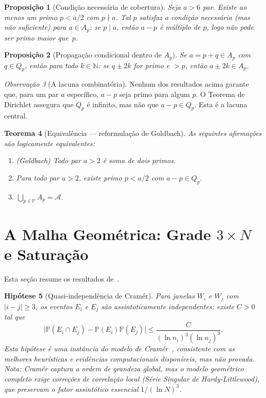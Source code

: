 \documentclass[12pt,a4paper]{article}
\newtheorem{theorem}{Teorema}[section]
\newtheorem{proposition}[theorem]{Proposi\c{c}\~ao}
\newtheorem{hypothesis}[theorem]{Hip\'otese}
\theoremstyle{remark}
\newtheorem{remark}[theorem]{Observa\c{c}\~ao}
\newcommand{\calA}{\mathcal{A}}
\newcommand{\NN}{\mathbb{N}}
\newcommand{\bP}{\mathbb{P}}
\begin{document}
	\begin{proposition}[Condição necessária de cobertura]
		\label{prop:cond-nec}
		Seja $a>6$ par. Existe ao menos um primo $p<a/2$ com $p\nmid a$.
		Tal $p$ satisfaz a condi\c{c}\~ao necess\'aria (mas n\~ao suficiente) para $a\in A_p$:
		se $p\mid a$, ent\~ao $a-p$ \'e m\'ultiplo de $p$, logo n\~ao pode ser primo maior que~$p$.
	\end{proposition}
	
	\begin{proposition}[Propagação condicional dentro de $A_p$]
		Se $a = p+q \in A_p$ com $q\in Q_p$, ent\~ao para todo $k\in\NN$: se $q\pm 2k$
		for primo e $> p$, ent\~ao $a\pm 2k\in A_p$.
	\end{proposition}
	
	\begin{remark}[A lacuna combinatória]
		\label{rem:lacuna-comb}
		Nenhum dos resultados acima garante que, para um par $a$ espec\'ifico,
		$a-p$ seja primo para algum $p$.  O Teorema de Dirichlet assegura que $Q_p$ \'e
		infinito, mas n\~ao que $a-p\in Q_p$.  Esta \'e a lacuna central.
	\end{remark}
	
	\begin{theorem}[Equivalência --- reformulação de Goldbach]
		\label{thm:equiv}
		As seguintes afirma\c{c}\~oes s\~ao logicamente equivalentes:
		\begin{enumerate}[\normalfont(i)]
			\item \emph{(Goldbach)} Todo par $a>2$ \'e soma de dois primos.
			\item Para todo par $a>2$, existe primo $p<a/2$ com $a-p\in Q_p$.
			\item $\bigcup_{p\in\bP} A_p = \calA$.
		\end{enumerate}
	\end{theorem}
	
	\section{A Malha Geom\'etrica: Grade $3\times N$ e Satura\c{c}\~ao}
	
	Esta se\c{c}\~ao resume os resultados de~\cite{bandeira2026geometrica}.
	
	\begin{hypothesis}[Quasi-independência de Cramér]
		Para janelas $W_i$ e $W_j$ com $|i-j|\geq 3$, os eventos $E_i$ e $E_j$ s\~ao
		assintoticamente independentes: existe $C>0$ tal que
		\[
		\bigl|\bP(E_i\cap E_j) - \bP(E_i)\bP(E_j)\bigr|
		\leq \frac{C}{(\ln n_i)^3(\ln n_j)^3}.
		\]
		Esta hip\'otese \'e uma inst\^ancia do modelo de Cram\'er~\cite{cramer1936},
		consistente com as melhores heur\'isticas e evid\^encias computacionais dispon\'iveis,
		mas n\~ao provada. Nota: Cramér captura a ordem de grandeza global, mas o modelo geométrico completo exige correções de correlação local (Série Singular de Hardy-Littlewood), que preservam o fator assintótico essencial $1/(\ln N)^3$.
	\end{hypothesis}
	
\end{document}

